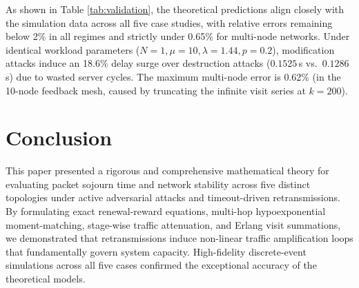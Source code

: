\documentclass[12pt,onecolumn]{article}
\begin{document}
\begin{table}[ht]
\centering
\caption{Cross-validation of analytical models vs. high-fidelity SimPy simulations.}
\label{tab:validation}
\end{table}

As shown in Table \ref{tab:validation}, the theoretical predictions align closely with the simulation data across all five case studies, with relative errors remaining below 2\% in all regimes and strictly under 0.65\% for multi-node networks. Under identical workload parameters ($N=1, \mu=10, \lambda=1.44, p=0.2$), modification attacks induce an 18.6\% delay surge over destruction attacks ($0.1525$\,s vs.\ $0.1286$\,s) due to wasted server cycles. The maximum multi-node error is 0.62\% (in the 10-node feedback mesh, caused by truncating the infinite visit series at $k = 200$).

\section{Conclusion}
This paper presented a rigorous and comprehensive mathematical theory for evaluating packet sojourn time and network stability across five distinct topologies under active adversarial attacks and timeout-driven retransmissions. By formulating exact renewal-reward equations, multi-hop hypoexponential moment-matching, stage-wise traffic attenuation, and Erlang visit summations, we demonstrated that retransmissions induce non-linear traffic amplification loops that fundamentally govern system capacity. High-fidelity discrete-event simulations across all five cases confirmed the exceptional accuracy of the theoretical models.
\end{document}
